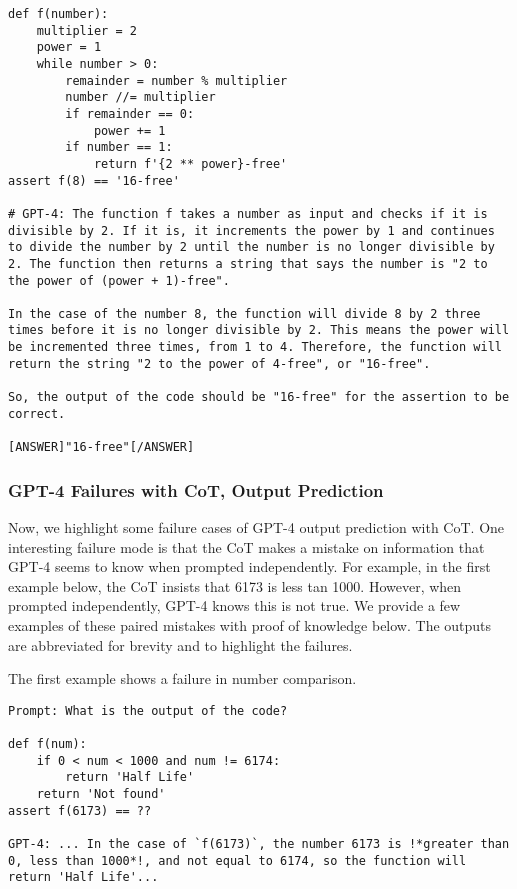 \begin{lstlisting}
def f(number):
    multiplier = 2
    power = 1
    while number > 0:
        remainder = number % multiplier
        number //= multiplier
        if remainder == 0:
            power += 1         
        if number == 1:
            return f'{2 ** power}-free'
assert f(8) == '16-free'

# GPT-4: The function f takes a number as input and checks if it is divisible by 2. If it is, it increments the power by 1 and continues to divide the number by 2 until the number is no longer divisible by 2. The function then returns a string that says the number is "2 to the power of (power + 1)-free".

In the case of the number 8, the function will divide 8 by 2 three times before it is no longer divisible by 2. This means the power will be incremented three times, from 1 to 4. Therefore, the function will return the string "2 to the power of 4-free", or "16-free".

So, the output of the code should be "16-free" for the assertion to be correct.

[ANSWER]"16-free"[/ANSWER]
\end{lstlisting}


\subsubsection{GPT-4 Failures with CoT, Output Prediction} \label{sec:appendix-gpt4-cot-output}
Now, we highlight some failure cases of GPT-4 output prediction with CoT. One interesting failure mode is that the CoT makes a mistake on information that GPT-4 seems to know when prompted independently. For example, in the first example below, the CoT insists that 6173 is less tan 1000. However, when prompted independently, GPT-4 knows this is not true. We provide a few examples of these paired mistakes with proof of knowledge below. The outputs are abbreviated for brevity and to highlight the failures.

The first example shows a failure in number comparison.
\begin{lstlisting}
Prompt: What is the output of the code?

def f(num):
    if 0 < num < 1000 and num != 6174:
        return 'Half Life'
    return 'Not found'
assert f(6173) == ??

GPT-4: ... In the case of `f(6173)`, the number 6173 is !*greater than 0, less than 1000*!, and not equal to 6174, so the function will return 'Half Life'...
\end{lstlisting}

